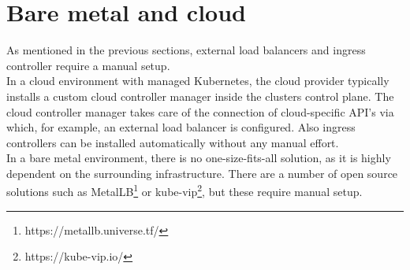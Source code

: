 \section{Bare metal and cloud}

As mentioned in the previous sections, external load balancers and ingress controller require a manual setup.
\\
In a cloud environment with managed Kubernetes, the cloud provider typically installs a custom cloud controller manager inside the clusters control plane.
The cloud controller manager takes care of the connection of cloud-specific API's via which, for example, an external load balancer is configured.
Also ingress controllers can be installed automatically without any manual effort.
\\
In a bare metal environment, there is no one-size-fits-all solution, as it is highly dependent on the surrounding infrastructure.
There are a number of open source solutions such as MetalLB\footnote{https://metallb.universe.tf/} or kube-vip\footnote{https://kube-vip.io/}, but these require manual setup.
